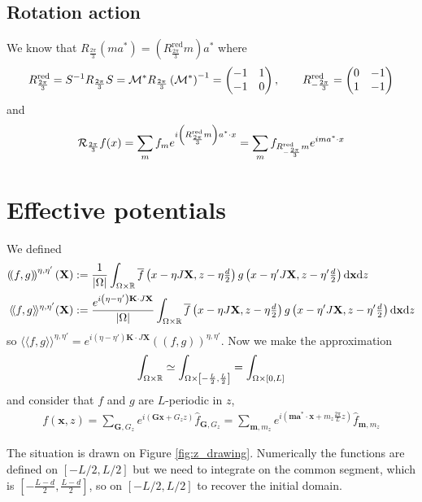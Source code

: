 \documentclass[11pt,a4paper,reqno,french,tikz]{amsart}
\def\d{{\rm d}}
\newcommand{\pa}[1]{\left( #1 \right)} %
\newcommand{\seg}[1]{\left[ #1 \right]} %
\newcommand{\ab}[1]{\left|#1\right|} %
\newcommand{\f}[2]{\frac{#1}{#2}} %
\newcommand{\mat}[1]{\begin{pmatrix} #1 \end{pmatrix}} %
\newcommand{\db}[1]{\left(\!\left( #1 \right)\!\right)}
\def\bX{{\mathbf X}}
\def\bG{{\mathbf G}}
\def\ba{{\mathbf a}}
\def\bx{{\mathbf x}}
\def\bmm{{\mathbf m}}
\def\bK{{\mathbf K}}
\newcommand{\dd}{\tfrac{d}{2}}
\def\lAngle{\langle\!\langle}
\def\rAngle{\rangle\!\rangle}
\begin{document}
\subsection{Rotation action}%
\label{sub:rotation_action}


We know that $R_{\f{2\pi}3} \pa{ma^* } = \pa{R_{\f{2\pi}3}^{\text{red}} m} a^*$ where
\begin{align*}
	R_{\f{2\pi}3}^{\text{red}} = S^{-1} R_{\f{2\pi}3} S =  \cM^* R_{\f{2\pi}3} \pa{\cM^*}^{-1} = \mat{-1 & 1 \\ -1 & 0}, \qquad R_{-\f{2\pi}3}^{\text{red}} = \mat{0 & -1 \\ 1 & -1}
\end{align*}
and
\begin{align*}
\cR_{\f{2\pi}3} f(x) = \sum_m f_m e^{i \pa{R_{\f{2\pi}3}^{\text{red}} m} a^* \cdot x} = \sum_m f_{R_{-\f{2\pi}3}^{\text{red}} m} e^{im a^* \cdot x}
\end{align*}



\section{Effective potentials}%
\label{sec:effective_potentials}

We defined
\begin{align*}
	\db{ f, g}^{\eta,\eta'}(\bX) &:=  \f{1}{\ab{\Omega}} \int_{\Omega \times \R} \overline{f}\pa{x -\eta J\bX,z- \eta\dd} g\pa{x - \eta' J \bX, z- \eta'\dd} \d \bx \d z \\
	\lAngle f, g \rAngle^{\eta,\eta'}(\bX) &:=  \f{e^{i\pa{\eta-\eta'} \bK \cdot J \bX}}{\ab{\Omega}} \int_{\Omega \times \R} \overline{f}\pa{x -\eta J\bX,z-\eta \dd} g\pa{x -\eta' J \bX, z-\eta'\dd} \d \bx \d z
\end{align*}
so $\lAngle f, g \rAngle^{\eta,\eta'} = e^{i\pa{\eta-\eta'} \bK \cdot J \bX}\db{ f, g}^{\eta,\eta'}$. Now we make the approximation
\begin{align*}
\int_{\Omega\times\R} \simeq \int_{\Omega\times \seg{-\f L2,\f L2}} = \int_{\Omega\times \seg{0,L}}
\end{align*}
and consider that $f$ and $g$ are $L$-periodic in $z$,
\begin{align*}
f(\bx,z) = \sum_{\bG,G_z} e^{i\pa{\bG \bx + G_z z}} \widehat{f}_{\bG,G_z}= \sum_{\bmm,m_z} e^{i\pa{\bmm \ba^* \cdot \bx + m_z \f{2\pi}L z}} \widehat{f}_{\bmm,m_z}
\end{align*}

The situation is drawn on Figure \ref{fig:z_drawing}. Numerically the functions are defined on $[-L/2,L/2]$ but we need to integrate on the common segment, which is $[-\f{L-d}{2},\f{L-d}{2}]$, so on $[-L/2,L/2]$ to recover the initial domain.
\end{document}
